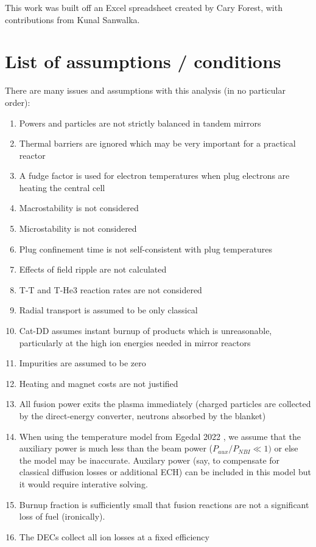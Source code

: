 This work was built off an Excel spreadsheet created by Cary Forest, with contributions from Kunal Sanwalka.

\section{List of assumptions / conditions}

There are many issues and assumptions with this analysis (in no particular order):
\begin{enumerate}
    \item Powers and particles are not strictly balanced in tandem mirrors
    \item Thermal barriers are ignored which may be very important for a practical reactor
    \item A fudge factor is used for electron temperatures when plug electrons are heating the central cell
    \item Macrostability is not considered
    \item Microstability is not considered
    \item Plug confinement time is not self-consistent with plug temperatures
    \item Effects of field ripple are not calculated
    \item T-T and T-He3 reaction rates are not considered
    \item Radial transport is assumed to be only classical 
    \item Cat-DD assumes instant burnup of products which is unreasonable, particularly at the high ion energies needed in mirror reactors
    \item Impurities are assumed to be zero
    \item Heating and magnet costs are not justified 
    \item All fusion power exits the plasma immediately (charged particles are collected by the direct-energy converter, neutrons absorbed by the blanket)
    \item When using the temperature model from Egedal 2022 \cite{Egedal_2022}, we assume that the auxiliary power is much less than the beam power ($P_{aux} / P_{NBI} \ll 1)$ or else the model may be inaccurate. Auxilary power (say, to compensate for classical diffusion losses or additional ECH) can be included in this model but it would require interative solving.
    \item Burnup fraction is sufficiently small that fusion reactions are not a significant loss of fuel (ironically).
    \item The DECs collect all ion losses at a fixed efficiency
\end{enumerate}


